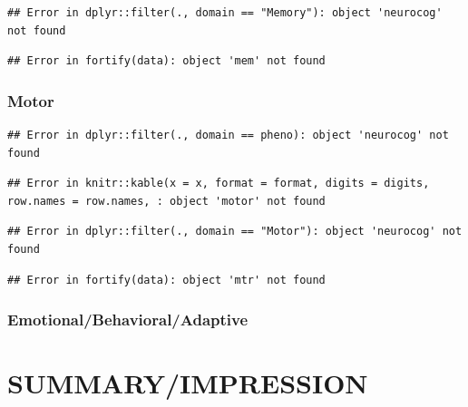 \documentclass[%
numbers=noendperiod,
parskip=half,
bibliography=totoc,
DIV=calc,headsepline=true,
]{scrartcl}
\begin{document}
\begin{verbatim}
## Error in dplyr::filter(., domain == "Memory"): object 'neurocog' not found
\end{verbatim}

\begin{verbatim}
## Error in fortify(data): object 'mem' not found
\end{verbatim}

\newpage

\hypertarget{motor}{%
\subsubsection{Motor}\label{motor}}

\begin{verbatim}
## Error in dplyr::filter(., domain == pheno): object 'neurocog' not found
\end{verbatim}




\begin{verbatim}
## Error in knitr::kable(x = x, format = format, digits = digits, row.names = row.names, : object 'motor' not found
\end{verbatim}

\begin{verbatim}
## Error in dplyr::filter(., domain == "Motor"): object 'neurocog' not found
\end{verbatim}

\begin{verbatim}
## Error in fortify(data): object 'mtr' not found
\end{verbatim}

\newpage

\hypertarget{emotionalbehavioraladaptive}{%
\subsubsection{Emotional/Behavioral/Adaptive}\label{emotionalbehavioraladaptive}}

\newpage

\hypertarget{summaryimpression}{%
\section{SUMMARY/IMPRESSION}\label{summaryimpression}}
\end{document}
